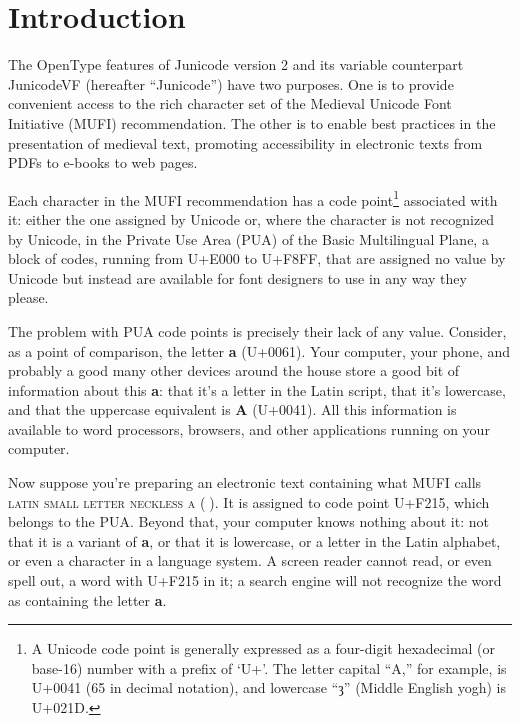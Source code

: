 \documentclass[letterpaper,12pt]{article}
\newcommand\textLetterExample[1]{\textrm{\textbf{#1}}}
\newcommand\textUName[1]{\textsc{#1}}
\begin{document}
\section{Introduction}
\hypertarget{intro}{}The OpenType features of Junicode version 2 and its variable counterpart JunicodeVF (hereafter
``Junicode'') have two purposes. One is to provide convenient access to the rich character set of the Medieval Unicode
Font Initiative (MUFI) recommendation. The other is to enable best practices in the presentation of medieval text,
promoting accessibility in electronic texts from PDFs to e-books to web pages.

Each character in the MUFI recommendation has a code point\footnote{A Unicode code point is generally expressed as a
four-digit hexadecimal (or base-16) number with a prefix of `U+'. The letter capital ``A,'' for example, is U+0041 (65
in decimal notation), and lowercase ``ȝ'' (Middle English yogh) is U+021D.} associated with it: either the one
assigned by Unicode or, where the character is not recognized by Unicode, in the Private Use Area (PUA) of the Basic
Multilingual Plane, a block of codes, running from U+E000 to U+F8FF, that are assigned no value by Unicode but instead
are available for font designers to use in any way they please.

The problem with PUA code points is precisely their lack of any value. Consider, as a point of comparison, the letter
\textLetterExample{a} (U+0061). Your computer, your phone, and probably a good many other devices around the house
store a good bit of information about this \textLetterExample{a}: that it's a letter in the Latin script, that
it's lowercase, and that the uppercase equivalent is \textLetterExample{A} (U+0041). All this information is
available to word processors, browsers, and other applications running on your computer.

Now suppose you're preparing an electronic text containing what MUFI calls \textUName{latin small letter neckless
a} (\textLetterExample{}). It is assigned to code point U+F215, which belongs to the PUA. Beyond that, your
computer knows nothing about it: not that it is a variant of \textLetterExample{a}, or that it is lowercase, or a letter in the Latin
alphabet, or even a character in a language system. A screen reader cannot read, or even spell out, a word with U+F215
in it; a search engine will not recognize the word as containing the letter \textLetterExample{a}.
\end{document}
